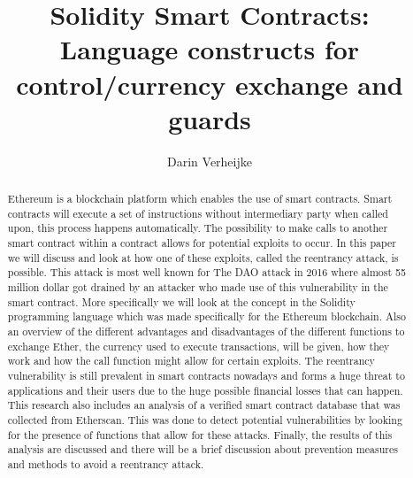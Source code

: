 \documentclass[sigconf]{acmart}
\begin{document}
\title{Solidity Smart Contracts: Language constructs for control/currency exchange and guards}

\author{Darin Verheijke}



\renewcommand{\shortauthors}{Trovato and Tobin, et al.}

\begin{abstract}
    Ethereum is a blockchain platform which enables the use of smart contracts. Smart contracts will execute a set of instructions without intermediary party when called upon, this process happens automatically. The possibility to make calls to another smart contract within a contract allows for potential exploits to occur. In this paper we will discuss and look at how one of these exploits, called the reentrancy attack, is possible. This attack is most well known for The DAO attack in 2016 where almost 55 million dollar got drained by an attacker who made use of this vulnerability in the smart contract. More specifically we will look at the concept in the Solidity programming language which was made specifically for the Ethereum blockchain. Also an overview of the different advantages and disadvantages of the different functions to exchange Ether, the currency used to execute transactions, will be given, how they work and how the call function might allow for certain exploits. The reentrancy vulnerability is still prevalent in smart contracts nowadays and forms a huge threat to applications and their users due to the huge possible financial losses that can happen. This research also includes an analysis of a verified smart contract database that was collected from Etherscan. This was done to detect potential vulnerabilities by looking for the presence of functions that allow for these attacks. Finally, the results of this analysis are discussed and there will be a brief discussion about prevention measures and methods to avoid a reentrancy attack.
\end{abstract}
\end{document}
